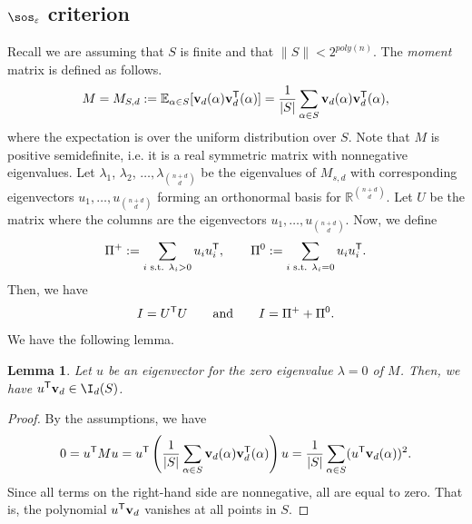 \documentclass[11pt]{article}
\newtheorem{lemma}[theorem]{Lemma}
\begin{document}
\subsection[SoS epsilon criterion]{$\sos_{\varepsilon}$ criterion}\label{sect:sos_criterion_subsection}
Recall we are assuming that $S$ is finite and that $\| S \| < 2^{poly(n)}$. The \emph{moment} matrix is defined as follows.
\begin{align}
M = M_{S,d} := \mathbb{E}_{\alpha \in S} [\mathbf{v}_d (\alpha) \mathbf{v}_d^{\sf{T}}(\alpha)] = \frac{1}{|S|}\sum_{\alpha\in S}\mathbf{v}_d (\alpha) \mathbf{v}_d^{\sf{T}}(\alpha),
\end{align}
where the expectation is over the uniform distribution over $S$. Note that $M$ is positive semidefinite, i.e. it is a real symmetric matrix with nonnegative eigenvalues. Let $\lambda_1$, $\lambda_2$, $\dots, \lambda_{\binom{n+d}{d}} $ be the eigenvalues of $M_{s,d}$ with corresponding eigenvectors $u_1, \dots, u_{\binom{n+d}{d}} $ forming an orthonormal basis for $\mathbb{R}^{\binom{n+d}{d}}$. Let $U$ be the matrix where the columns are the eigenvectors $u_1,\ldots,u_{\binom{n+d}{d}}$. 
Now, we define 
\begin{align}\label{Pi}
    \Pi^+ := \sum_{i \text{ s.t. } \lambda_i >0} u_i u_i^{\sf{T}}, \qquad \Pi^0 := \sum_{i \text{ s.t. } \lambda_i =0} u_i u_i^{\sf{T}}. 
\end{align}
    Then, we have 
    \begin{equation*}
        I = U^{\sf{T}} U \qquad \text{and} \qquad I = \Pi^+ + \Pi^0.
    \end{equation*}
We have the following lemma.
\begin{lemma}\label{th:eigen-to-ideal}
Let $u$ be an eigenvector for the zero eigenvalue $\lambda=0$ of $M$. Then, we have $u^{\sf{T}}\mathbf{v}_d\in \I_d(S)$.
\end{lemma} 
\begin{proof}
    By the assumptions, we have
    \begin{equation*}
        0=u^{\sf{T}} M u = u^{\sf{T}}\left(\frac{1}{|S|}\sum_{\alpha\in S}\mathbf{v}_d (\alpha) \mathbf{v}_d^{\sf{T}}(\alpha)\right)u=\frac{1}{|S|}\sum_{\alpha\in S}(u^{\sf{T}}\mathbf{v}_d(\alpha))^2.
    \end{equation*}
Since all terms on the right-hand side are nonnegative, all are equal to zero. That is, the polynomial $u^{\sf{T}} \mathbf{v}_d$ vanishes at all points in $S$.   
\end{proof}
\end{document}
